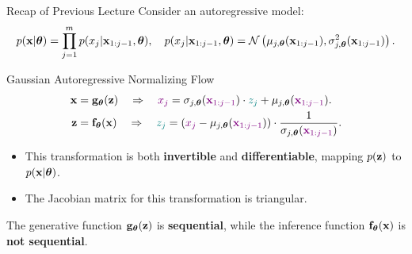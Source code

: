 \documentclass{beamer}
\begin{document}
\begin{frame}{Recap of Previous Lecture}
	Consider an autoregressive model:
	\vspace{-0.3cm}
	{\small
		\[
		p(\mathbf{x} | \boldsymbol{\theta}) = \prod_{j=1}^m p(x_j | \mathbf{x}_{1:j - 1}, \boldsymbol{\theta}), \quad
		p(x_j | \mathbf{x}_{1:j - 1}, \boldsymbol{\theta}) = \mathcal{N} \left(\mu_{j, \boldsymbol{\theta}}(\mathbf{x}_{1:j-1}), \sigma^2_{j, \boldsymbol{\theta}} (\mathbf{x}_{1:j-1})\right).
		\]
	}
	\vspace{-0.5cm}
	\begin{block}{Gaussian Autoregressive Normalizing Flow}
		\vspace{-0.5cm}
		\begin{align*}
			\mathbf{x} &= \mathbf{g}_{\boldsymbol{\theta}}(\mathbf{z}) \quad \Rightarrow \quad {\color{violet} x_j} = \sigma_{j, \boldsymbol{\theta}} ({\color{violet} \mathbf{x}_{1:j-1}}) \cdot {\color{teal} z_j} + \mu_{j, \boldsymbol{\theta}}({\color{violet} \mathbf{x}_{1:j-1}}). \\
			\mathbf{z} &= \mathbf{f}_{\boldsymbol{\theta}}(\mathbf{x}) \quad \Rightarrow \quad {\color{teal} z_j} = \left({\color{violet}x_j} - \mu_{j, \boldsymbol{\theta}}({\color{violet}\mathbf{x}_{1:j-1}}) \right) \cdot \frac{1}{ \sigma_{j, \boldsymbol{\theta}} ({\color{violet}\mathbf{x}_{1:j-1}})}.
		\end{align*}
		\vspace{-0.5cm}
	\end{block}
	\begin{itemize}
		\item This transformation is both \textbf{invertible} and \textbf{differentiable}, mapping $p(\mathbf{z})$ to $p(\mathbf{x} | \boldsymbol{\theta})$.
		\item The Jacobian matrix for this transformation is triangular.
	\end{itemize}
	The generative function $\mathbf{g}_{\boldsymbol{\theta}}(\mathbf{z})$ is \textbf{sequential}, while the inference function $\mathbf{f}_{\boldsymbol{\theta}}(\mathbf{x})$ is \textbf{not sequential}.
	
\end{frame}
\end{document}
